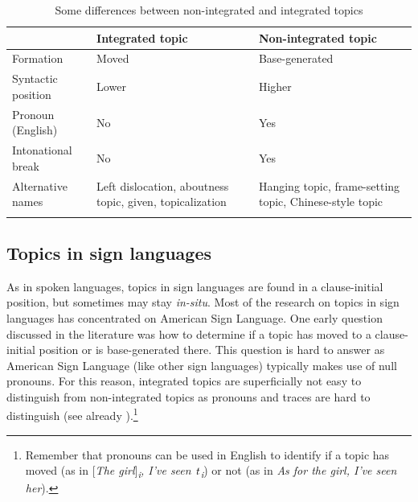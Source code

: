 \begin{table}
\begin{tabularx}{\textwidth}{lQQ}
\lsptoprule
 &  Integrated topic & Non-integrated topic   \\\midrule
Formation & Moved & Base-generated   \\
Syntactic position & Lower & Higher   \\
Pronoun (English) & No & Yes   \\
Intonational break & No & Yes   \\
Alternative names & Left dislocation, aboutness topic, given, topicalization & Hanging topic, frame-setting topic, Chinese-style topic\\
\lspbottomrule
\end{tabularx}
\caption{Some differences between non-integrated and integrated topics\label{ldhtdiffnew}}
\end{table}

\subsection{Topics in sign languages}\label{topicsinsignlanguages}
As in spoken languages, topics in sign languages are found in a clause-initial position, but sometimes may stay \textit{in-situ}. Most of the research on topics in sign languages has concentrated on American Sign Language. One early question discussed in the literature was how to determine if a topic has moved to a clause-initial position or is base-generated there. This question is hard to answer as American Sign Language (like other sign languages) typically makes use of null pronouns. For this reason, integrated topics are superficially not easy to distinguish from non-integrated topics as pronouns and traces are hard to distinguish (see already \citealt{lillo1986two, lillo1986parameter}).\footnote{ Remember that pronouns can be used in English to identify if a topic has moved (as in \textit{$[$The girl$]$\textsubscript{i}, I've seen $\textrm{\textit{t}}$\textsubscript{i}}) or not (as in \textit{As for the girl, I've seen her}).}

